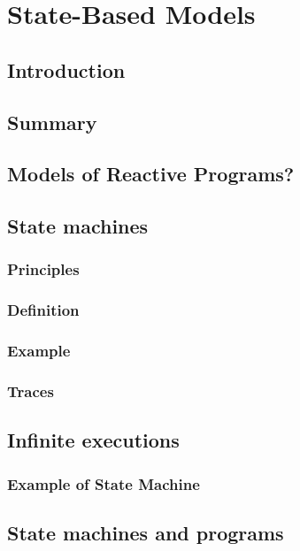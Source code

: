 \documentclass[12pt, a4paper]{book}
\begin{document}
  \section{State-Based Models}
  \label{sec:State-Based Models}
  \subsection{Introduction}
  \label{sub:Introduction}
  \subsection{Summary}
  \label{sub:Summary}
  \subsection{Models of Reactive Programs?}
  \label{sub:Models of Reactive Programs?}
  \subsection{State machines}
  \label{sub:State machines}
  \subsubsection{Principles}
  \label{subs:Principles}
  \subsubsection{Definition}
  \label{subs:Definition}
  \subsubsection{Example}
  \label{subs:Example}
  \subsubsection{Traces}
  \label{subs:Traces}
  \subsection{Infinite executions}
  \label{sub:Infinite executions}
  \subsubsection{Example of State Machine}
  \label{subs:Example of State Machine}
  \subsection{State machines and programs}
  \label{sub:State machines and programs}
\end{document}
